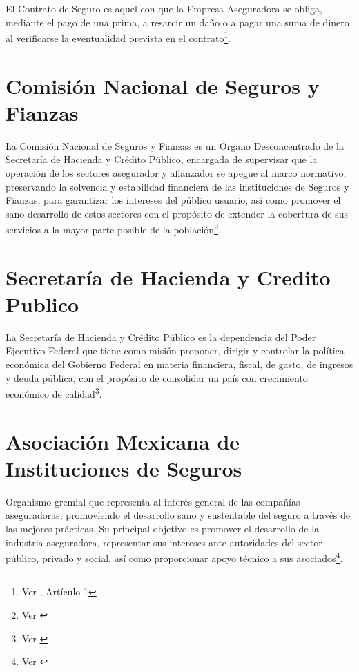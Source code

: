 \documentclass[11pt,twoside,openright,spanish]{report}
\numberwithin{equation}{chapter}
\numberwithin{figure}{chapter}
\numberwithin{table}{chapter}
\begin{document}
	El Contrato de Seguro es aquel con que la Empresa Aseguradora se obliga, mediante el pago de una prima, a resarcir un daño o a pagar una suma de dinero al verificarse la eventualidad prevista en el contrato\footnote{Ver \citet{CContrato}, Artículo 1}.
	
		\section{Comisión Nacional de Seguros y Fianzas}
	
	La Comisión Nacional de Seguros y Fianzas es un Órgano Desconcentrado de la Secretaría de Hacienda y Crédito Público, encargada de supervisar que la operación de los sectores asegurador y afianzador se apegue al marco normativo, preservando la solvencia y estabilidad financiera de las instituciones de Seguros y Fianzas, para garantizar los intereses del público usuario, así como promover el sano desarrollo de estos sectores con el propósito de extender la cobertura de sus servicios a la mayor parte posible de la población\footnote{Ver \citet{EComision}}. 
	
	\section{Secretaría de Hacienda y Credito Publico}
	
	La Secretaría de Hacienda y Crédito Público es la dependencia del Poder Ejecutivo Federal que tiene como misión proponer, dirigir y controlar la política económica del Gobierno Federal en materia financiera, fiscal, de gasto, de ingresos y deuda pública, con el propósito de consolidar un país con crecimiento económico de calidad\footnote{Ver \citet{NSHCP}}.
	
	
	\section{Asociación Mexicana de Instituciones de Seguros}
	
	Organismo gremial que representa al interés general de las compañías aseguradoras, promoviendo el desarrollo sano y sustentable del seguro a través de las mejores prácticas. Su principal objetivo es promover el desarrollo de la industria aseguradora, representar sus  intereses ante autoridades del sector público, privado y social, así como proporcionar apoyo técnico a sus asociados\footnote{Ver \citet{FAmis}}. 
	
\end{document}
